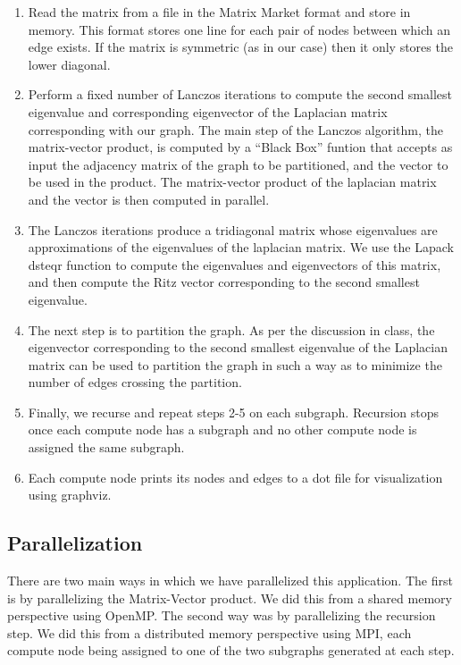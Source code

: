 \documentclass[11pt, oneside]{article}   	%
\begin{document}
\begin{enumerate}
	\item Read the matrix from a file in the Matrix Market format and store in memory. This format stores one line for each pair of nodes between which an edge exists. If the matrix is symmetric (as in our case) then it only stores the lower diagonal.

	\item Perform a fixed number of Lanczos iterations to compute the second smallest eigenvalue and corresponding eigenvector of the Laplacian matrix corresponding with our graph. The main step of the Lanczos algorithm, the matrix-vector product, is computed by a ``Black Box'' funtion that accepts as input the adjacency matrix of the graph to be partitioned, and the vector to be used in the product. The matrix-vector product of the laplacian matrix and the vector is then computed in parallel.

	\item The Lanczos iterations produce a tridiagonal matrix whose eigenvalues are approximations of the eigenvalues of the laplacian matrix.  We use the Lapack dsteqr function to compute the eigenvalues and eigenvectors of this matrix, and then compute the Ritz vector corresponding to the second smallest eigenvalue.

	\item The next step is to partition the graph. As per the discussion in class, the eigenvector corresponding to the second smallest eigenvalue of the Laplacian matrix can be used to partition the graph in such a way as to minimize the number of edges crossing the partition.

	\item Finally, we recurse and repeat steps 2-5 on each subgraph. Recursion stops once each compute node has a subgraph and no other compute node is assigned the same subgraph.

	\item Each compute node prints its nodes and edges to a dot file for visualization using graphviz.
\end{enumerate}

\subsection{Parallelization}
There are two main ways in which we have parallelized this application. The first is by parallelizing the Matrix-Vector product. We did this from a shared memory perspective using OpenMP. The second way was by parallelizing the recursion step. We did this from a distributed memory perspective using MPI, each compute node being assigned to one of the two subgraphs generated at each step.
\end{document}
